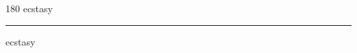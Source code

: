 
\begin{frame}
\begin{center}
\begin{turn}{180}
{\fontsize{2.5cm}{1em}\selectfont ecstasy}
\end{turn}
\vspace{1em}\par  
\hrule
\vspace{1em}\par  
{\fontsize{2.5cm}{1em}\selectfont ecstasy}
\end{center}
\end{frame}
